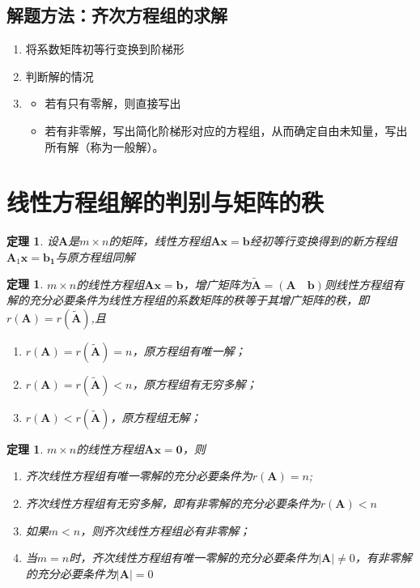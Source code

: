 \documentclass[12pt,oneside]{ctexbook}
\newtheorem{theorem}[subsection]{定理}
\begin{document}
\subsection{解题方法：齐次方程组的求解}
\begin{enumerate}
    \item 将系数矩阵初等行变换到阶梯形
    \item 判断解的情况
    \item {\begin{itemize}
        \item 若有只有零解，则直接写出
        \item 若有非零解，写出简化阶梯形对应的方程组，从而确定自由未知量，写出所有解（称为一般解）。
        \end{itemize}}
\end{enumerate}

\section{线性方程组解的判别与矩阵的秩}
\label{equation&r}
\begin{theorem}
    设\(\mathbf{A}\)是\(m \times n\)的矩阵，线性方程组\(\mathbf{A}\mathbf{x}=\mathbf{b}\)经初等行变换得到的新方程组\(\mathbf{A}_1\mathbf{x}=\mathbf{b_1}\)与原方程组同解
\end{theorem}

\begin{theorem}
    \(m \times n\)的线性方程组\(\mathbf{A}\mathbf{x}=\mathbf{b}\)，增广矩阵为\(\tilde{\mathbf{A}}=(\mathbf{A} \quad \mathbf{b})\)则线性方程组有解的充分必要条件为线性方程组的系数矩阵的秩等于其增广矩阵的秩，即\(r(\mathbf{A})=r(\tilde{\mathbf{A}})\),且
    \begin{enumerate}
        \item \(r(\mathbf{A})=r(\tilde{\mathbf{A}})=n\)，原方程组有唯一解；
        \item \(r(\mathbf{A})=r(\tilde{\mathbf{A}})<n\)，原方程组有无穷多解；
        \item \(r(\mathbf{A})<r(\tilde{\mathbf{A}})\)，原方程组无解；
    \end{enumerate}
\end{theorem}

\begin{theorem}
    \(m \times n\)的线性方程组\(\mathbf{A}\mathbf{x}=\mathbf{0}\)，则
    \begin{enumerate}
        \item 齐次线性方程组有唯一零解的充分必要条件为\(r(\mathbf{A})=n\);
        \item 齐次线性方程组有无穷多解，即有非零解的充分必要条件为\(r(\mathbf{A})<n\)
        \item 如果\(m<n\)，则齐次线性方程组必有非零解；
        \item 当\(m=n\)时，齐次线性方程组有唯一零解的充分必要条件为\(\rvert \mathbf{A} \rvert \neq 0\)，有非零解的充分必要条件为\(\rvert \mathbf{A} \rvert = 0\)
    \end{enumerate}
\end{theorem}
\end{document}
